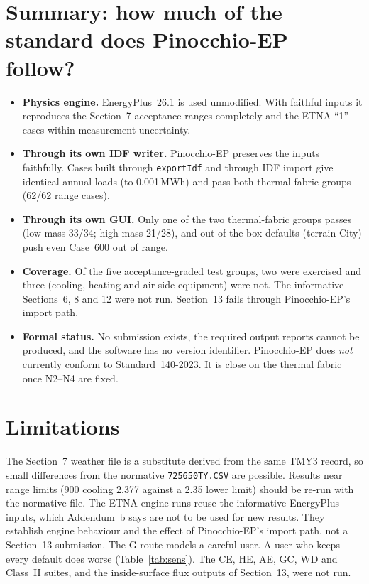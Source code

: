 \documentclass[10pt,a4paper]{article}
\newcommand{\code}[1]{\texttt{\small #1}}
\begin{document}
\section{Summary: how much of the standard does Pinocchio-EP follow?}
\begin{itemize}
\item \textbf{Physics engine.} EnergyPlus~26.1 is used unmodified. With faithful inputs it reproduces the
Section~7 acceptance ranges completely and the ETNA ``1'' cases within measurement uncertainty.
\item \textbf{Through its own IDF writer.} Pinocchio-EP preserves the inputs faithfully. Cases built through
\code{exportIdf} and through IDF import give identical annual loads (to 0.001\,MWh) and pass both thermal-fabric groups
(62/62 range cases).
\item \textbf{Through its own GUI.} Only one of the two thermal-fabric groups passes (low mass 33/34; high mass
21/28), and out-of-the-box defaults (terrain City) push even Case~600 out of range.
\item \textbf{Coverage.} Of the five acceptance-graded test groups, two were exercised and three (cooling,
heating and air-side equipment) were not. The informative Sections~6, 8 and 12 were not run. Section~13 fails
through Pinocchio-EP's import path.
\item \textbf{Formal status.} No submission exists, the required output reports cannot be produced, and the
software has no version identifier. Pinocchio-EP does \emph{not} currently conform to Standard~140-2023. It is
close on the thermal fabric once N2--N4 are fixed.
\end{itemize}

\section{Limitations}
The Section~7 weather file is a substitute derived from the same TMY3 record, so small differences from the
normative \code{725650TY.CSV} are possible. Results near range limits (900 cooling 2.377 against a 2.35 lower
limit) should be re-run with the normative file. The ETNA engine runs reuse the informative EnergyPlus inputs, which
Addendum~b says are not to be used for new results. They establish engine behaviour and the effect of Pinocchio-EP's
import path, not a Section~13 submission. The G route models a careful user. A user who keeps every default does
worse (Table~\ref{tab:sens}). The CE, HE, AE, GC, WD and Class~II suites, and the inside-surface flux outputs of
Section~13, were not run.
\end{document}
